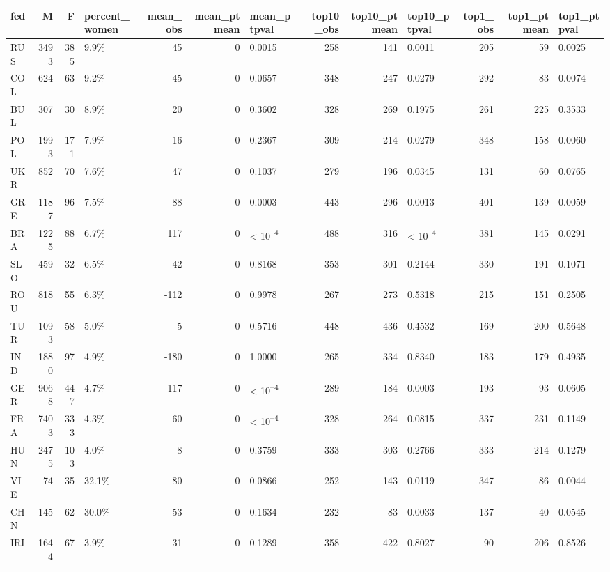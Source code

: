 
\begin{tabular}{l|r|r|l|r|r|l|r|r|l|r|r|l}
\hline
fed & M & F & percent_women & mean_obs & mean_ptmean & mean_ptpval & top10_obs & top10_ptmean & top10_ptpval & top1_obs & top1_ptmean & top1_ptpval\\
\hline
RUS & 3493 & 385 & 9.9\% & 45 & 0 & 0.0015 & 258 & 141 & 0.0011 & 205 & 59 & 0.0025\\
\hline
COL & 624 & 63 & 9.2\% & 45 & 0 & 0.0657 & 348 & 247 & 0.0279 & 292 & 83 & 0.0074\\
\hline
BUL & 307 & 30 & 8.9\% & 20 & 0 & 0.3602 & 328 & 269 & 0.1975 & 261 & 225 & 0.3533\\
\hline
POL & 1993 & 171 & 7.9\% & 16 & 0 & 0.2367 & 309 & 214 & 0.0279 & 348 & 158 & 0.0060\\
\hline
UKR & 852 & 70 & 7.6\% & 47 & 0 & 0.1037 & 279 & 196 & 0.0345 & 131 & 60 & 0.0765\\
\hline
GRE & 1187 & 96 & 7.5\% & 88 & 0 & 0.0003 & 443 & 296 & 0.0013 & 401 & 139 & 0.0059\\
\hline
BRA & 1225 & 88 & 6.7\% & 117 & 0 & < 10\textsuperscript{--4} & 488 & 316 & < 10\textsuperscript{--4} & 381 & 145 & 0.0291\\
\hline
SLO & 459 & 32 & 6.5\% & -42 & 0 & 0.8168 & 353 & 301 & 0.2144 & 330 & 191 & 0.1071\\
\hline
ROU & 818 & 55 & 6.3\% & -112 & 0 & 0.9978 & 267 & 273 & 0.5318 & 215 & 151 & 0.2505\\
\hline
TUR & 1093 & 58 & 5.0\% & -5 & 0 & 0.5716 & 448 & 436 & 0.4532 & 169 & 200 & 0.5648\\
\hline
IND & 1880 & 97 & 4.9\% & -180 & 0 & 1.0000 & 265 & 334 & 0.8340 & 183 & 179 & 0.4935\\
\hline
GER & 9068 & 447 & 4.7\% & 117 & 0 & < 10\textsuperscript{--4} & 289 & 184 & 0.0003 & 193 & 93 & 0.0605\\
\hline
FRA & 7403 & 333 & 4.3\% & 60 & 0 & < 10\textsuperscript{--4} & 328 & 264 & 0.0815 & 337 & 231 & 0.1149\\
\hline
HUN & 2475 & 103 & 4.0\% & 8 & 0 & 0.3759 & 333 & 303 & 0.2766 & 333 & 214 & 0.1279\\
\hline
VIE & 74 & 35 & 32.1\% & 80 & 0 & 0.0866 & 252 & 143 & 0.0119 & 347 & 86 & 0.0044\\
\hline
CHN & 145 & 62 & 30.0\% & 53 & 0 & 0.1634 & 232 & 83 & 0.0033 & 137 & 40 & 0.0545\\
\hline
IRI & 1644 & 67 & 3.9\% & 31 & 0 & 0.1289 & 358 & 422 & 0.8027 & 90 & 206 & 0.8526\\

\end{tabular}
